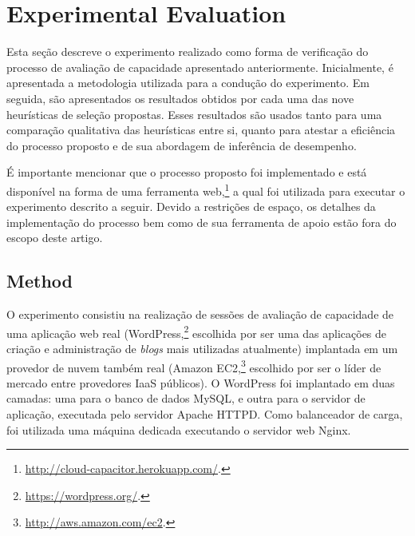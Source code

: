 \documentclass[10pt,conference,compsocconf]{IEEEtran}
\begin{document}

\section{Experimental Evaluation}\label{sec:experiments}

Esta seção descreve o experimento realizado como forma de verificação do processo de avaliação de capacidade apresentado anteriormente. Inicialmente, é apresentada a metodologia utilizada para a condução do experimento. Em seguida, são apresentados os resultados obtidos por cada uma das nove heurísticas de seleção propostas. Esses resultados são usados tanto para uma comparação qualitativa das heurísticas entre si, quanto para atestar
a eficiência do processo proposto e de sua abordagem de inferência de desempenho. 

É importante mencionar que o processo proposto foi implementado e está disponível na forma de uma ferramenta web,\footnote{\scriptsize \url{http://cloud-capacitor.herokuapp.com/}.} a qual foi utilizada para executar o experimento descrito a seguir. Devido a restrições de espaço, os detalhes da implementação do processo bem como de sua ferramenta de apoio estão fora do escopo deste artigo.

\subsection{Method}

O experimento consistiu na realização de sessões de avaliação de
capacidade de uma aplicação web real (WordPress,\footnote{\scriptsize \url{https://wordpress.org/}.} escolhida por ser uma das aplicações de criação e administração de \emph{blogs} mais utilizadas atualmente) implantada em um provedor de nuvem também real (Amazon EC2,\footnote{\scriptsize \url{http://aws.amazon.com/ec2}.} escolhido por ser o líder de mercado entre provedores IaaS públicos). O WordPress foi implantado em duas camadas: uma para o banco de  dados MySQL, e outra para o servidor de aplicação, executada pelo servidor Apache HTTPD. Como balanceador de carga, foi utilizada uma máquina dedicada executando o servidor web Nginx. 


\end{document}
